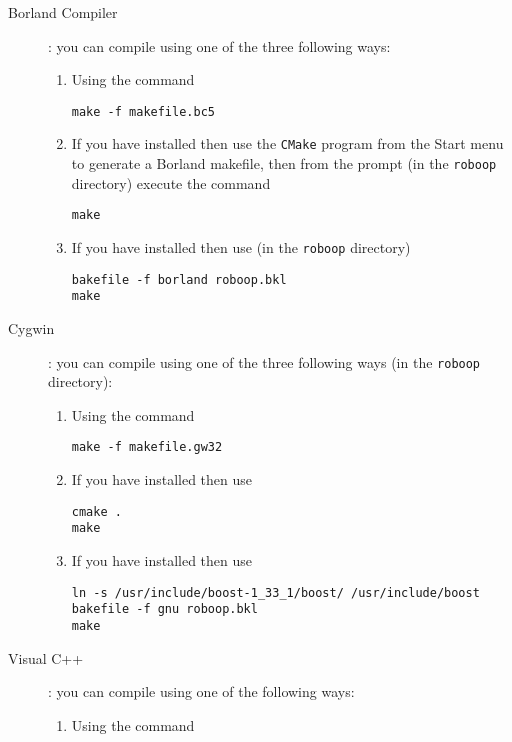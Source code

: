 \documentclass[dvips,11pt,fleqn]{report}
\begin{document}
\begin{description}
\item[Borland Compiler] : you can compile using one of the three
  following ways:
  \begin{enumerate}
  \item Using the command 
\begin{verbatim}
make -f makefile.bc5
\end{verbatim}
  \item If you have
    installed then use the \texttt{CMake} program from the
    \textsf{Start} menu to generate a \textsf{Borland makefile}, then
    from the prompt (in the \texttt{roboop} directory) execute the
    command
\begin{verbatim}
make
\end{verbatim}
  \item If you have
    installed then use (in the \texttt{roboop} directory)
\begin{verbatim}
bakefile -f borland roboop.bkl
make
\end{verbatim}
  \end{enumerate}
\item[Cygwin]: you can compile using one of the three following
ways (in the \texttt{roboop} directory):
\begin{enumerate}
\item Using the command 
\begin{verbatim}
make -f makefile.gw32
\end{verbatim}
\item If you have
   installed
  then use
\begin{verbatim}
cmake .
make
\end{verbatim}
\item If you have
  installed then use
\begin{verbatim}
ln -s /usr/include/boost-1_33_1/boost/ /usr/include/boost
bakefile -f gnu roboop.bkl
make
\end{verbatim}
\end{enumerate}
\item[Visual C++]: you can compile using one of the following ways:
  \begin{enumerate}
  \item Using the command 

\end{enumerate}
\end{description}
\end{document}
